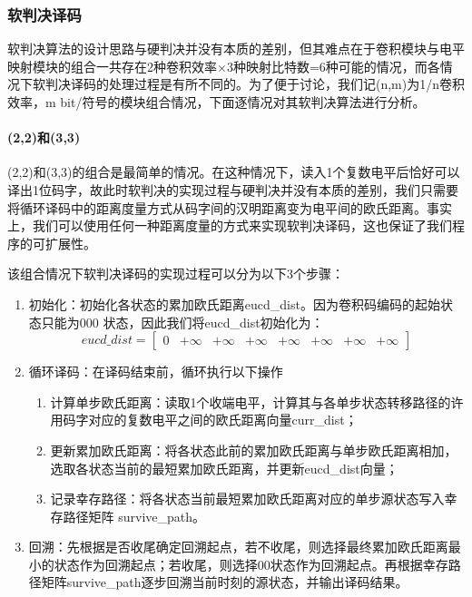 \subsubsection{软判决译码}

软判决算法的设计思路与硬判决并没有本质的差别，但其难点在于卷积模块与电平映射模块的组合一共存在2种卷积效率$\times$3种映射比特数=6种可能的情况，而各情况下软判决译码的处理过程是有所不同的。为了便于讨论，我们记(n,m)为1/n卷积效率，m bit/符号的模块组合情况，下面逐情况对其软判决算法进行分析。

\paragraph{(2,2)和(3,3)}
\indent

(2,2)和(3,3)的组合是最简单的情况。在这种情况下，读入1个复数电平后恰好可以译出1位码字，故此时软判决的实现过程与硬判决并没有本质的差别，我们只需要将循环译码中的距离度量方式从码字间的汉明距离变为电平间的欧氏距离。事实上，我们可以使用任何一种距离度量的方式来实现软判决译码，这也保证了我们程序的可扩展性。

该组合情况下软判决译码的实现过程可以分为以下3个步骤：

\begin{enumerate}
    \item 初始化：初始化各状态的累加欧氏距离eucd\_dist。因为卷积码编码的起始状态只能为000 状态，因此我们将eucd\_dist初始化为：
    $$eucd\_dist=[
    \begin{matrix}
        0 & +\infty & +\infty & +\infty &
        +\infty & +\infty & +\infty & +\infty
    \end{matrix}
    ]$$
    \item 循环译码：在译码结束前，循环执行以下操作
    \begin{enumerate}
        \item 计算单步欧氏距离：读取1个收端电平，计算其与各单步状态转移路径的许用码字对应的复数电平之间的欧氏距离向量curr\_dist；
        \item 更新累加欧氏距离：将各状态此前的累加欧氏距离与单步欧氏距离相加，选取各状态当前的最短累加欧氏距离，并更新eucd\_dist向量；
        \item 记录幸存路径：将各状态当前最短累加欧氏距离对应的单步源状态写入幸存路径矩阵 survive\_path。
    \end{enumerate}
    \item 回溯：先根据是否收尾确定回溯起点，若不收尾，则选择最终累加欧氏距离最小的状态作为回溯起点；若收尾，则选择00状态作为回溯起点。再根据幸存路径矩阵survive\_path逐步回溯当前时刻的源状态，并输出译码结果。
\end{enumerate}

